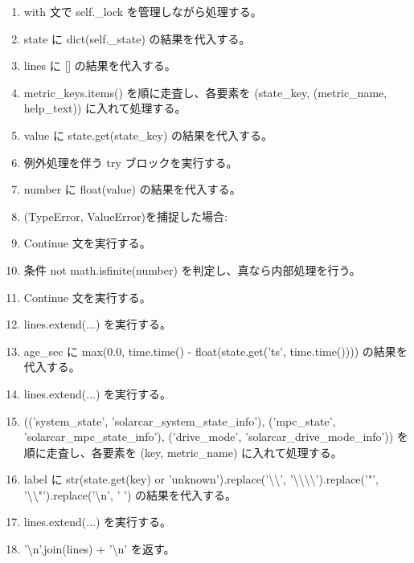 \documentclass[a4paper,11pt]{article}
\begin{document}
\begin{enumerate}[leftmargin=1.8em]
\item with 文で self.\_lock を管理しながら処理する。
\item   state に dict(self.\_state) の結果を代入する。
\item lines に [] の結果を代入する。
\item metric\_keys.items() を順に走査し、各要素を (state\_key, (metric\_name, help\_text)) に入れて処理する。
\item   value に state.get(state\_key) の結果を代入する。
\item   例外処理を伴う try ブロックを実行する。
\item     number に float(value) の結果を代入する。
\item     (TypeError, ValueError)を捕捉した場合:
\item     Continue 文を実行する。
\item   条件 not math.isfinite(number) を判定し、真なら内部処理を行う。
\item     Continue 文を実行する。
\item   lines.extend(...) を実行する。
\item age\_sec に max(0.0, time.time() - float(state.get('ts', time.time()))) の結果を代入する。
\item lines.extend(...) を実行する。
\item (('system\_state', 'solarcar\_system\_state\_info'), ('mpc\_state', 'solarcar\_mpc\_state\_info'), ('drive\_mode', 'solarcar\_drive\_mode\_info')) を順に走査し、各要素を (key, metric\_name) に入れて処理する。
\item   label に str(state.get(key) or 'unknown').replace('\textbackslash{}\textbackslash{}', '\textbackslash{}\textbackslash{}\textbackslash{}\textbackslash{}').replace('"', '\textbackslash{}\textbackslash{}"').replace('\textbackslash{}n', ' ') の結果を代入する。
\item   lines.extend(...) を実行する。
\item '\textbackslash{}n'.join(lines) + '\textbackslash{}n' を返す。
            \end{enumerate}
\end{document}
